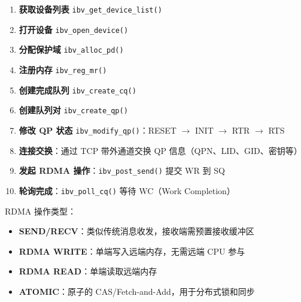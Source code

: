 \begin{enumerate}
  \item \textbf{获取设备列表} \texttt{ibv\_get\_device\_list()}
  \item \textbf{打开设备} \texttt{ibv\_open\_device()}
  \item \textbf{分配保护域} \texttt{ibv\_alloc\_pd()}
  \item \textbf{注册内存} \texttt{ibv\_reg\_mr()}
  \item \textbf{创建完成队列} \texttt{ibv\_create\_cq()}
  \item \textbf{创建队列对} \texttt{ibv\_create\_qp()}
  \item \textbf{修改 QP 状态} \texttt{ibv\_modify\_qp()}：RESET $\rightarrow$ INIT $\rightarrow$ RTR $\rightarrow$ RTS
  \item \textbf{连接交换}：通过 TCP 带外通道交换 QP 信息（QPN、LID、GID、密钥等）
  \item \textbf{发起 RDMA 操作}：\texttt{ibv\_post\_send()} 提交 WR 到 SQ
  \item \textbf{轮询完成}：\texttt{ibv\_poll\_cq()} 等待 WC（Work Completion）
\end{enumerate}

RDMA 操作类型：
\begin{itemize}
  \item \textbf{SEND/RECV}：类似传统消息收发，接收端需预置接收缓冲区
  \item \textbf{RDMA WRITE}：单端写入远端内存，无需远端 CPU 参与
  \item \textbf{RDMA READ}：单端读取远端内存
  \item \textbf{ATOMIC}：原子的 CAS/Fetch-and-Add，用于分布式锁和同步
\end{itemize}

